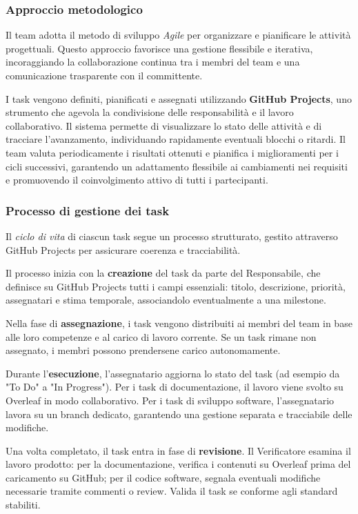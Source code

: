 \documentclass[a4paper, 11pt, oneside]{scrartcl} %
\begin{document}
\subsubsection{Approccio metodologico}
Il team adotta il metodo di sviluppo \emph{Agile}{\scriptsize{}} per organizzare e pianificare le attività progettuali.
Questo approccio favorisce una gestione flessibile e iterativa, incoraggiando la collaborazione continua tra i membri del team e una comunicazione trasparente con il committente.

I task vengono definiti, pianificati e assegnati utilizzando \textbf{GitHub Projects}{\scriptsize{}}, uno strumento che agevola la condivisione delle responsabilità e il lavoro collaborativo.
Il sistema permette di visualizzare lo stato delle attività e di tracciare l'avanzamento, individuando rapidamente eventuali blocchi o ritardi.
Il team valuta periodicamente i risultati ottenuti e pianifica i miglioramenti per i cicli successivi, garantendo un adattamento flessibile ai cambiamenti nei requisiti e promuovendo il coinvolgimento attivo di tutti i partecipanti.

\subsubsection{Processo di gestione dei task}
Il \emph{ciclo di vita}{\scriptsize{}} di ciascun task segue un processo strutturato, gestito attraverso GitHub Projects per assicurare coerenza e tracciabilità.

Il processo inizia con la \textbf{creazione} del task da parte del Responsabile, che definisce su GitHub Projects tutti i campi essenziali: titolo, descrizione, priorità, assegnatari e stima temporale, associandolo eventualmente a una milestone{\scriptsize{}}.

Nella fase di \textbf{assegnazione}, i task vengono distribuiti ai membri del team in base alle loro competenze e al carico di lavoro corrente.
Se un task rimane non assegnato, i membri possono prendersene carico autonomamente.

Durante l'\textbf{esecuzione}, l'assegnatario aggiorna lo stato del task (ad esempio da "To Do" a "In Progress"). 
Per i task di documentazione, il lavoro viene svolto su Overleaf in modo collaborativo. 
Per i task di sviluppo software, l'assegnatario lavora su un branch dedicato, garantendo una gestione separata e tracciabile delle modifiche.

Una volta completato, il task entra in fase di \textbf{revisione}.
Il Verificatore esamina il lavoro prodotto: per la documentazione, verifica i contenuti su Overleaf prima del caricamento su GitHub; per il codice software, segnala eventuali modifiche necessarie tramite commenti o review. Valida il task se conforme agli standard stabiliti.
\end{document}
